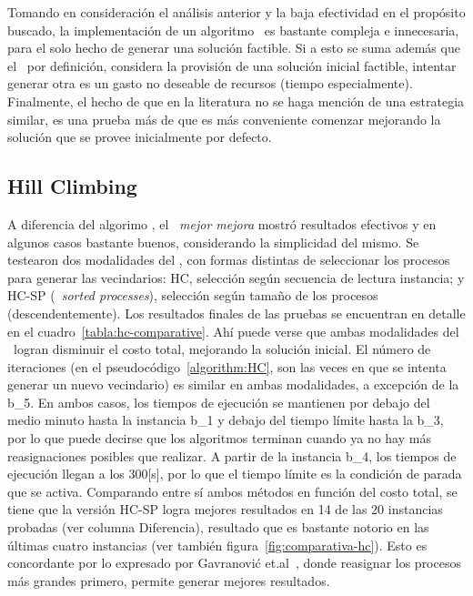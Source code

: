 \documentclass[../informe2.tex]{subfiles}
\begin{document}
\noindent Tomando en consideración el análisis anterior y la baja efectividad en el propósito buscado, la implementación de un algoritmo \greedy\ es bastante compleja e innecesaria, para el solo hecho de generar una solución factible. Si a esto se suma además que el \mrp\ por definición, considera la provisión de una solución inicial factible, intentar generar otra es un gasto no deseable de recursos (tiempo especialmente). Finalmente, el hecho de que en la literatura no se haga mención de una estrategia similar, es una prueba más de que es más conveniente comenzar mejorando la solución que se provee inicialmente por defecto.

\subsection{Hill Climbing}
A diferencia del algorimo \greedy, el \hillc\ \textit{mejor mejora} mostró resultados efectivos y en algunos casos bastante buenos, considerando la simplicidad del mismo. Se testearon dos modalidades del \hillc, con formas distintas de seleccionar los procesos para generar las vecindarios: HC, selección según secuencia de lectura instancia; y HC-SP (\hillc\ \textit{sorted processes}), selección según tamaño de los procesos (descendentemente). Los resultados finales de las pruebas se encuentran en detalle en el cuadro~\ref{tabla:hc-comparative}. Ahí puede verse que ambas modalidades del \hillc\  logran disminuir el costo total, mejorando la solución inicial. El número de iteraciones (en el pseudocódigo~\ref{algorithm:HC}, son las veces en que se intenta generar un nuevo vecindario) es similar en ambas modalidades, a excepción de la b\_5. En ambos casos, los tiempos de ejecución se mantienen por debajo del medio minuto hasta la instancia b\_1 y debajo del tiempo límite hasta la b\_3, por lo que puede decirse que los algoritmos terminan cuando ya no hay más reasignaciones posibles que realizar. A partir de la instancia b\_4, los tiempos de ejecución llegan a los 300[s], por lo que el tiempo límite es la condición de parada que se activa. Comparando entre sí ambos métodos en función del costo total, se tiene que la versión HC-SP logra mejores resultados en 14 de las 20 instancias probadas (ver columna Diferencia), resultado que es bastante notorio en las últimas cuatro instancias (ver también figura~\ref{fig:comparativa-hc}). Esto es concordante por lo expresado por Gavranović et.al~\cite{gavranovicefficient}, donde reasignar los procesos más grandes primero, permite generar mejores resultados.
\makeatletter
\setlength{\@fptop}{0pt}
\end{document}
